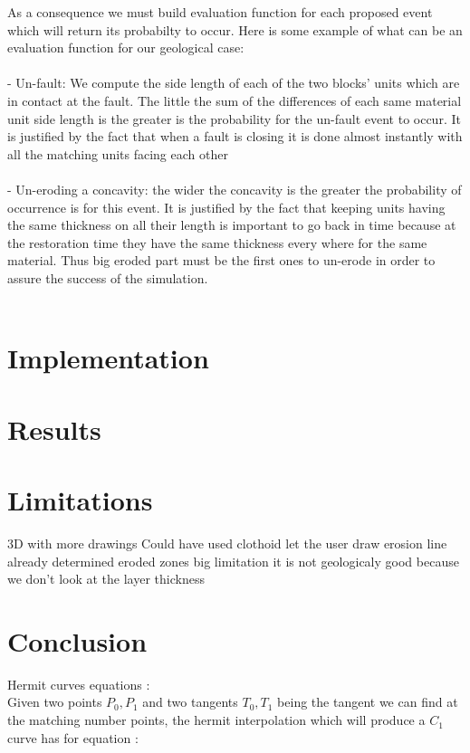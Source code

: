 \documentclass[12pt, a4paper]{memoir} %
\begin{document}
As a consequence we must build evaluation function for each proposed event which will return its probabilty to occur. Here is some example of what can be an evaluation function for our geological case:\\\\

 - Un-fault: We compute the side length of each of the two blocks' units which are in contact at the fault. The little the sum of the differences of each same material unit side length is the greater is the probability for the un-fault event to occur. It is justified by the fact that when a fault is closing it is done almost instantly with all the matching units facing each other\\\\
 
 - Un-eroding a concavity: the wider the concavity is the greater the probability of occurrence is for this event. It is justified by the fact that keeping units having the same thickness on all their length is important to go back in time because at the restoration time they have the same thickness every where for the same material. Thus big eroded part must be the first ones to un-erode in order to assure the success of the simulation.\\\\
 

\section{Implementation}

\section{Results}
\section{Limitations}
3D with more drawings
Could have used clothoid
let the user draw erosion line
already determined eroded zones
big limitation it is not geologicaly good because we don't look at the layer thickness
\section{Conclusion}



	

Hermit curves equations :\\
Given two points $P_0, P_1$ and two tangents $T_0, T_1$ being the tangent we can find at the matching number points, the hermit interpolation which will produce a $C_1$ curve has for equation : 
\end{document}

